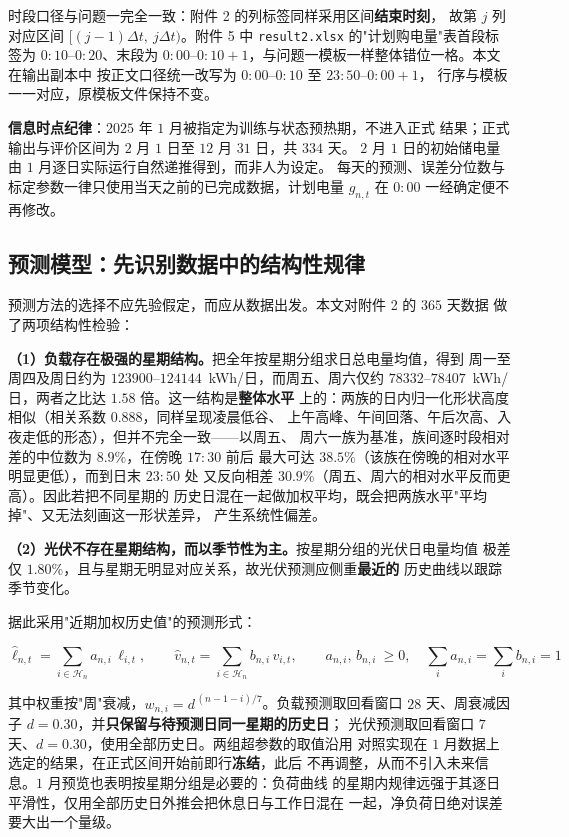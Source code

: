 \documentclass[withoutpreface,bwprint]{cumcmthesis}
\begin{document}
时段口径与问题一完全一致：附件 2 的列标签同样采用区间\textbf{结束时刻}，
故第 $j$ 列对应区间 $[(j-1)\Delta t,\ j\Delta t)$。附件 5 中
\texttt{result2.xlsx} 的"计划购电量"表首段标签为 $0{:}10$--$0{:}20$、末段为
$0{:}00$--$0{:}10{+}1$，与问题一模板一样整体错位一格。本文在输出副本中
按正文口径统一改写为 $0{:}00$--$0{:}10$ 至 $23{:}50$--$0{:}00{+}1$，
行序与模板一一对应，原模板文件保持不变。

\textbf{信息时点纪律}：$2025$ 年 $1$ 月被指定为训练与状态预热期，不进入正式
结果；正式输出与评价区间为 $2$ 月 $1$ 日至 $12$ 月 $31$ 日，共 $334$ 天。
$2$ 月 $1$ 日的初始储电量由 $1$ 月逐日实际运行自然递推得到，而非人为设定。
每天的预测、误差分位数与标定参数一律只使用当天之前的已完成数据，计划电量
$g_{n,t}$ 在 $0{:}00$ 一经确定便不再修改。

\subsection{预测模型：先识别数据中的结构性规律}

预测方法的选择不应先验假定，而应从数据出发。本文对附件 2 的 $365$ 天数据
做了两项结构性检验：

\textbf{（1）负载存在极强的星期结构。}把全年按星期分组求日总电量均值，得到
周一至周四及周日约为 $123900$--$124144$~kWh/日，而周五、周六仅约
$78332$--$78407$~kWh/日，两者之比达 $1.58$ 倍。这一结构是\textbf{整体水平}
上的：两族的日内归一化形状高度相似（相关系数 $0.888$，同样呈现凌晨低谷、
上午高峰、午间回落、午后次高、入夜走低的形态），但并不完全一致——以周五、
周六一族为基准，族间逐时段相对差的中位数为 $8.9\%$，在傍晚 $17{:}30$ 前后
最大可达 $38.5\%$（该族在傍晚的相对水平明显更低），而到日末 $23{:}50$ 处
又反向相差 $30.9\%$（周五、周六的相对水平反而更高）。因此若把不同星期的
历史日混在一起做加权平均，既会把两族水平"平均掉"、又无法刻画这一形状差异，
产生系统性偏差。

\textbf{（2）光伏不存在星期结构，而以季节性为主。}按星期分组的光伏日电量均值
极差仅 $1.80\%$，且与星期无明显对应关系，故光伏预测应侧重\textbf{最近的}
历史曲线以跟踪季节变化。

据此采用"近期加权历史值"的预测形式：

\begin{equation}
  \widehat{\ell}_{n,t}=\sum_{i\in\mathcal{H}_n}a_{n,i}\,\ell_{i,t},
  \qquad
  \widehat{v}_{n,t}=\sum_{i\in\mathcal{H}_n}b_{n,i}\,v_{i,t},
  \qquad
  a_{n,i},\,b_{n,i}\ \ge 0,\quad \sum_i a_{n,i}=\sum_i b_{n,i}=1
  \label{eq:p2-forecast}
\end{equation}

其中权重按"周"衰减，$w_{n,i}=d^{\,(n-1-i)/7}$。负载预测取回看窗口
$28$ 天、周衰减因子 $d=0.30$，并\textbf{只保留与待预测日同一星期的历史日}；
光伏预测取回看窗口 $7$ 天、$d=0.30$，使用全部历史日。两组超参数的取值沿用
对照实现在 $1$ 月数据上选定的结果，在正式区间开始前即行\textbf{冻结}，此后
不再调整，从而不引入未来信息。$1$ 月预览也表明按星期分组是必要的：负荷曲线
的星期内规律远强于其逐日平滑性，仅用全部历史日外推会把休息日与工作日混在
一起，净负荷日绝对误差要大出一个量级。
\end{document}
